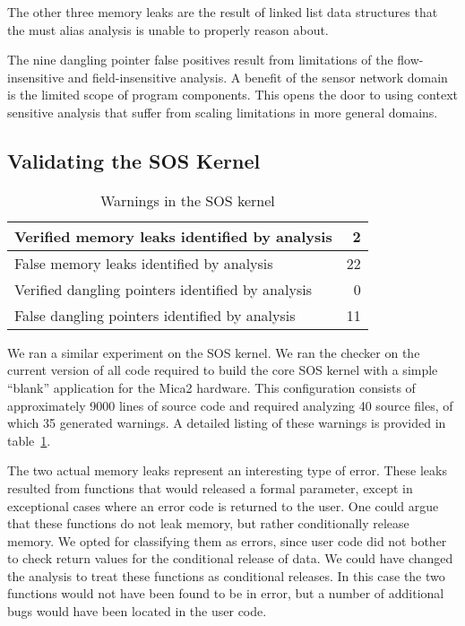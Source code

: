 The other three memory leaks are the result of linked list data
structures that the must alias analysis is unable to properly reason
about.  

\smallskip{}

The nine dangling pointer false positives result from limitations of
the flow-insensitive and field-insensitive analysis.  A benefit of the
sensor network domain is the limited scope of program components.
This opens the door to using context sensitive analysis that suffer
from scaling limitations in more general domains.



\subsection{Validating the SOS Kernel}

\begin{table}
\caption{Warnings in the SOS kernel}
%
\label{tab:kernel}
\centering 
\begin{tabular}{| l | r |}
    \hline 
    Verified memory leaks identified by analysis & 2 \\
    \hline
    False memory leaks identified by analysis & 22 \\
    \hline 
    Verified dangling pointers identified by analysis & 0 \\
    \hline 
    False dangling pointers identified by analysis & 11 \\
    \hline 
    \hline 
\end{tabular} 
%
\end{table}


We ran a similar experiment on the SOS kernel.  We ran the checker on
the current version of all code required to build the core SOS kernel
with a simple ``blank'' application for the Mica2 hardware.  This
configuration consists of approximately 9000 lines of source code and required
analyzing 40 source files, of which 35 generated warnings.  A detailed
listing of these warnings is provided in table~\ref{tab:kernel}.

The two actual memory leaks represent an interesting type of error.
These leaks resulted from functions that would released a formal
parameter, except in exceptional cases where an error code is returned
to the user.  One could argue that these functions do not leak memory,
but rather conditionally release memory.  We opted for classifying
them as errors, since user code did not bother to check return values
for the conditional release of data.  We could have changed the
analysis to treat these functions as conditional releases.  In this
case the two functions would not have been found to be in error, but a
number of additional bugs would have been located in the user code.

